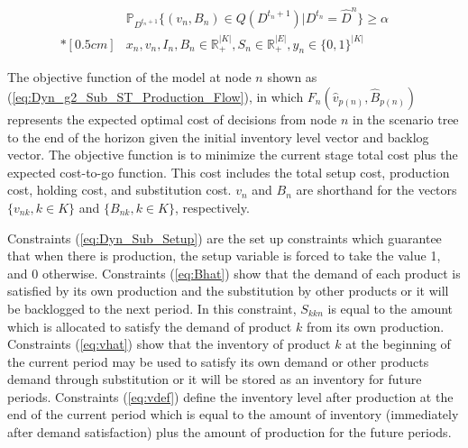 \documentclass[10pt]{article}
\newcommand{\ti}{t} %
\newcommand{\ka}{k} %
\newcommand{\KA}{K}
\newcommand{\jey}{j} %
\newcommand{\Bi}{B} %
\newcommand{\Vi}{v} %
\newcommand{\Es}{S} %
\newcommand{\InvPos}{inventory level after production }
\begin{document}
\begin{subequations}
\begin{flalign}
\\
& \mathbb{P}_{D^{t_n+1}}\{ ({\Vi}_{n}, {\Bi}_{n} ) \in Q(D^{\ti_n+1} )| D^{\ti_n} = \hat{D}^{n} \} \geq \alpha& \label{eq:SL}
& \\*[0.5cm]
& {x}_{ n },  {v}_{ n },  {I}_{ n } , {\Bi}_{ n } \in \mathbb{R}_{+}^{|\KA|} , {S}_{n} \in \mathbb{R}_{+}^{|E|} ,{y}_{ n } \in \{0,1\}^{|\KA|} &  & \label{eq:Dyn_F_Sub_ST_bound1}
\end{flalign}
\end{subequations}

The objective function of the model at node $n$ shown as (\ref{eq:Dyn_g2_Sub_ST_Production_Flow}), in which $F_{n}(\hat{\Vi}_{p(n)},\hat{\Bi}_{p(n)}) $ represents the expected optimal cost of decisions from node $n$ in the scenario tree to the end of the horizon given the initial inventory level vector and backlog vector. The objective function is to minimize the current stage total cost plus the expected cost-to-go function. This cost includes the total setup cost, production cost, holding cost, and substitution cost.  $\Vi_n$ and $\Bi_n$ are shorthand for the vectors $\{ v_{nk}, k \in K\}$ and $\{ B_{nk}, k \in K\}$, respectively.

Constraints (\ref{eq:Dyn_Sub_Setup}) are the set up constraints which guarantee that when there is production, the setup variable is forced to take the value 1, and 0 otherwise. 
Constraints (\ref{eq:Bhat}) show that the demand of each product is satisfied by its own production and the substitution by other products or it will be backlogged to the next period. In this constraint, $\Es_{\ka \ka n}$ is equal to the amount which is allocated to satisfy the demand of product $k$ from its own production. Constraints (\ref{eq:vhat}) show that the inventory of product $\ka$ at the beginning of the current period may be used to satisfy its own demand or other products demand through substitution or it will be stored as an inventory for future periods. 
Constraints (\ref{eq:vdef}) define the \InvPos at the end of the current period which is equal to the amount of inventory (immediately after demand satisfaction) plus the amount of production for the future periods.
\end{document}
